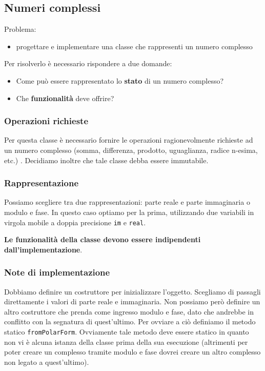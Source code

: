 \documentclass{article}
\begin{document}
\subsection{Numeri complessi}
Problema:
\begin{itemize}
\item  progettare e implementare una classe che rappresenti un numero complesso
\end{itemize}

Per risolverlo è necessario rispondere a due domande:
\begin{itemize}
\item Come può essere rappresentato lo \textbf{stato} di un numero complesso?
\item Che \textbf{funzionalità} deve offrire?
\end{itemize}

\subsubsection{Operazioni richieste}

Per questa classe è necessario fornire le operazioni
ragionevolmente richieste ad un numero complesso
(somma, differenza, prodotto, uguaglianza, radice n-esima, etc.) .
Decidiamo inoltre che tale classe debba essere immutabile.

\subsubsection{Rappresentazione}

Possiamo scegliere tra due rappresentazioni:
parte reale e parte immaginaria o modulo e fase.
In questo caso optiamo per la prima,
utilizzando due variabili in virgola mobile a doppia precisione
\texttt{im} e \texttt{real}.

\textbf{Le funzionalità della classe devono essere indipendenti dall'implementazione}.

\subsubsection{Note di implementazione}

Dobbiamo definire un costruttore per inizializzare l'oggetto.
Scegliamo di passagli direttamente i valori di parte reale e immaginaria.
Non possiamo però definire un altro costruttore che prenda come ingresso
modulo e fase, dato che andrebbe in conflitto con la segnatura di quest'ultimo.
Per ovviare a ciò definiamo il metodo statico \texttt{fromPolarForm}.
Ovviamente tale metodo deve essere statico in quanto non vi è
alcuna istanza della classe prima della sua esecuzione (altrimenti
per poter creare un complesso tramite modulo e fase dovrei creare un altro complesso
non legato a quest'ultimo).
\end{document}
